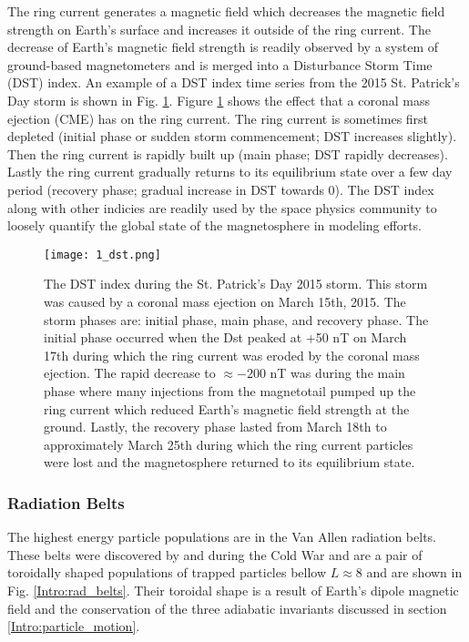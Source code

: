 The ring current generates a magnetic field which decreases the magnetic field strength on Earth's surface and increases it outside of the ring current. The decrease of Earth's magnetic field strength is readily observed by a system of ground-based magnetometers and is merged into a Disturbance Storm Time (DST) index. An example of a DST index time series from the 2015 St. Patrick's Day storm is shown in Fig. \ref{Intro:dst}. Figure \ref{Intro:dst} shows the effect that a coronal mass ejection (CME) has on the ring current. The ring current is sometimes first depleted (initial phase or sudden storm commencement; DST increases slightly). Then the ring current is rapidly built up (main phase; DST rapidly decreases). Lastly the ring current gradually returns to its equilibrium state over a few day period (recovery phase; gradual increase in DST towards 0). The DST index along with other indicies are readily used by the space physics community to loosely quantify the global state of the magnetosphere in modeling efforts.

\begin{figure}
\texttt{[image: 1\_dst.png]}
\caption{The DST index during the St. Patrick's Day 2015 storm. This storm was caused by a coronal mass ejection on March 15th, 2015. The storm phases are: initial phase, main phase, and recovery phase. The initial phase occurred when the Dst peaked at +50 nT on March 17th during which the ring current was eroded by the coronal mass ejection. The rapid decrease to $\approx -200$ nT was during the main phase where many injections from the magnetotail pumped up the ring current which reduced Earth's magnetic field strength at the ground. Lastly, the recovery phase lasted from March 18th to approximately March 25th during which the ring current particles were lost and the magnetosphere returned to its equilibrium state.}
\label{Intro:dst}
\end{figure}

\subsubsection{Radiation Belts}\label{Intro:radiation_belt}
The highest energy particle populations are in the Van Allen radiation belts. These belts were discovered by \citet{Allen1959} and \citet{Vernov1960} during the Cold War and are a pair of toroidally shaped populations of trapped particles bellow $L \approx 8$ and are shown in Fig. \ref{Intro:rad_belts}. Their toroidal shape is a result of Earth's dipole magnetic field and the conservation of the three adiabatic invariants discussed in section \ref{Intro:particle_motion}.

